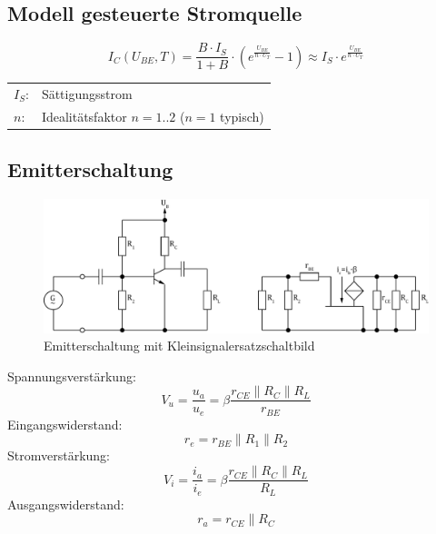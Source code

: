 \subsection{Modell gesteuerte Stromquelle}
\[ I_C(U_{BE}, T) = \frac{B \cdot I_S}{1 + B} 
\cdot \left(e^{\frac{U_{BE}}{n \cdot U_T}} - 1\right) 
\approx I_S \cdot e^{\frac{U_{BE}}{n \cdot U_T}} \]
\begin{tabular}{@{}ll}
  $I_S$:	    & Sättigungsstrom \\
  $n$:	        & Idealitätsfaktor $n = 1..2$ ($n = 1$ typisch) \\
\end{tabular}

\subsection{Emitterschaltung}
\begin{figure}[h!]
	\centering
	\includegraphics[width = \linewidth]{trans_emitter.pdf}
	\caption{Emitterschaltung mit Kleinsignalersatzschaltbild}
	\label{trans:emitterschaltung}
\end{figure}
\noindent
Spannungsverstärkung:
\[
	V_u = \frac{u_a}{u_e} = \beta \frac{r_{CE} \parallel R_C \parallel R_L}{r_{BE}}
\]
Eingangswiderstand:
\[
	r_e = r_{BE} \parallel R_1 \parallel R_2
\]
Stromverstärkung:
\[
	V_i = \frac{i_a}{i_e} = \beta \frac{r_{CE} \parallel R_C \parallel R_L}{R_L}
\]
Ausgangswiderstand:
\[
	r_a = r_{CE} \parallel R_C
\]

